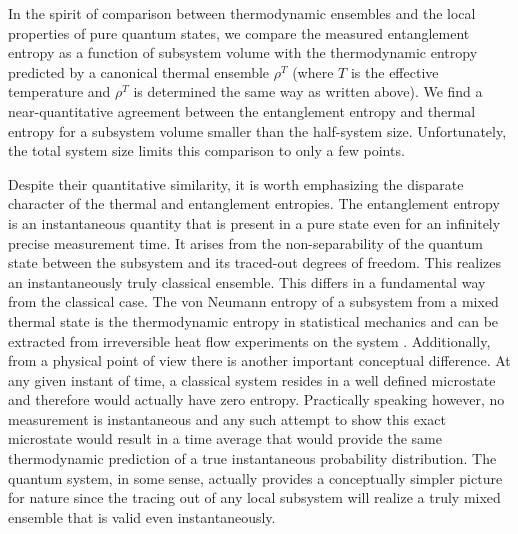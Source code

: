 
In the spirit of comparison between thermodynamic ensembles and the local properties of pure quantum states, we compare the measured entanglement entropy as a function of subsystem volume with the thermodynamic entropy predicted by a canonical thermal ensemble $\rho^T$ (where $T$ is the effective temperature and $\rho^T$ is determined the same way as written above). We find a near-quantitative agreement between the entanglement entropy and thermal entropy for a subsystem volume smaller than the half-system size. Unfortunately, the total system size limits this comparison to only a few points.

Despite their quantitative similarity, it is worth emphasizing the disparate character of the thermal and entanglement entropies. The entanglement entropy is an instantaneous quantity that is present in a pure state even for an infinitely precise measurement time. It arises from the non-separability of the quantum state between the subsystem and its traced-out degrees of freedom. This realizes an instantaneously truly classical ensemble. This differs in a fundamental way from the classical case. The von Neumann  entropy of a subsystem from a mixed thermal state is the thermodynamic entropy in statistical mechanics and can be extracted from irreversible heat flow experiments on the system \cite{Deutsch2013}. Additionally, from a physical point of view there is another important conceptual difference. At any given instant of time, a classical system resides in a well defined microstate and therefore would actually have zero entropy. Practically speaking however, no measurement is instantaneous and any such attempt to show this exact microstate would result in a time average that would provide the same thermodynamic prediction of a true instantaneous probability distribution. The quantum system, in some sense, actually provides a conceptually simpler picture for nature since the tracing out of any local subsystem will realize a truly mixed ensemble that is valid even instantaneously. 

